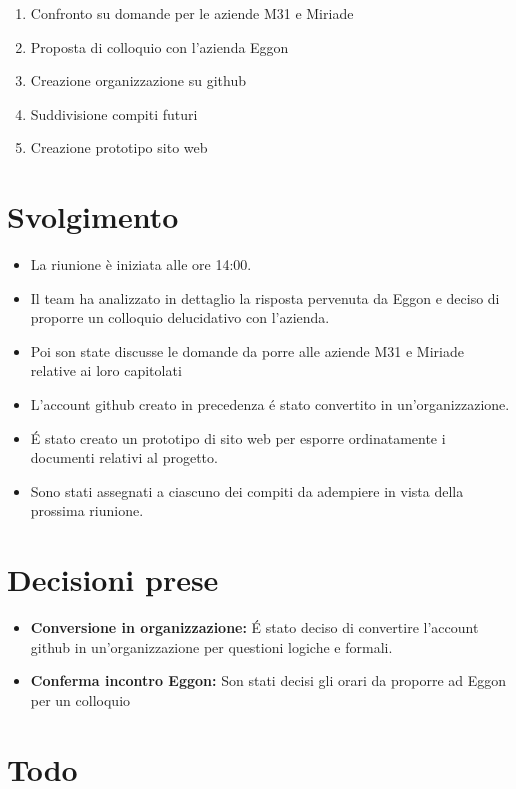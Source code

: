 \documentclass[a4paper,12pt]{article}
\begin{document}
\begin{enumerate}
    \item Confronto su domande per le aziende M31 e Miriade
    \item Proposta di colloquio con l'azienda Eggon
    \item Creazione organizzazione su github
    \item Suddivisione compiti futuri
    \item Creazione prototipo sito web
\end{enumerate}

\section{Svolgimento}

\begin{itemize}
    \item La riunione è iniziata alle ore 14:00.
    \item Il team ha analizzato in dettaglio la risposta pervenuta da Eggon e deciso di proporre un colloquio delucidativo con l'azienda.
    \item Poi son state discusse le domande da porre alle aziende M31 e Miriade relative ai loro capitolati
    \item L'account github creato in precedenza é stato convertito in un'organizzazione.
    \item É stato creato un prototipo di sito web per esporre ordinatamente i documenti relativi al progetto.
    \item Sono stati assegnati a ciascuno dei compiti da adempiere in vista della prossima riunione.
\end{itemize}

\section{Decisioni prese}

\begin{itemize}
    \item \textbf{Conversione in organizzazione:} É stato deciso di convertire l'account github in un'organizzazione per questioni logiche e formali.
    \item \textbf{Conferma incontro Eggon:} Son stati decisi gli orari da proporre ad Eggon per un colloquio
\end{itemize}

\section{Todo}
\end{document}
